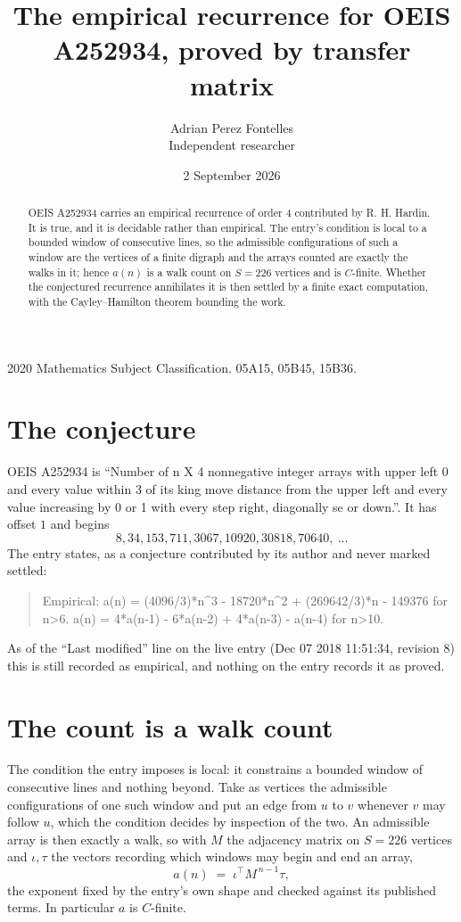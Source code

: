 \documentclass[11pt,a4paper]{article}
\title{The empirical recurrence for OEIS A252934, proved by transfer matrix}
\author{Adrian Perez Fontelles\\ \small Independent researcher}
\date{2 September 2026}
\theoremstyle{plain}
\theoremstyle{definition}
\begin{document}
\maketitle

\begin{abstract}
OEIS A252934 carries an empirical recurrence of order $4$ contributed by R. H. Hardin. It is
true, and it is decidable rather than empirical. The entry's condition is local to a bounded window of consecutive lines, so
the admissible configurations of such a window are the vertices of a finite digraph and the
arrays counted are exactly the walks in it; hence $a(n)$ is a walk count on $S=226$ vertices
and is $C$-finite. Whether the conjectured recurrence annihilates it is then settled by a
finite exact computation, with the Cayley--Hamilton theorem bounding the work.
\end{abstract}

\noindent\small 2020 Mathematics Subject Classification. 05A15, 05B45, 15B36.\normalsize

\section{The conjecture}

OEIS A252934 is ``Number of n X 4 nonnegative integer arrays with upper left 0 and every value within 3 of its king move distance from the upper left and every value increasing by 0 or 1 with every step right, diagonally se or down.''. It has offset $1$ and begins
\[
8, 34, 153, 711, 3067, 10920, 30818, 70640,\ \dots
\]
The entry states, as a conjecture contributed by its author and never marked settled:
\begin{quote}
Empirical: a(n) = (4096/3)*n\^{}3 - 18720*n\^{}2 + (269642/3)*n - 149376 for n>6. a(n) = 4*a(n-1) - 6*a(n-2) + 4*a(n-3) - a(n-4) for n>10.
\end{quote}
As of the ``Last modified'' line on the live entry (Dec 07 2018 11:51:34, revision 8) this is still
recorded as empirical, and nothing on the entry records it as proved.

\section{The count is a walk count}

The condition the entry imposes is local: it constrains a bounded window of consecutive lines and nothing beyond. Take as
vertices the admissible configurations of one such window and put an edge from $u$ to $v$
whenever $v$ may follow $u$, which the condition decides by inspection of the two. An
admissible array is then exactly a walk, so with $M$ the adjacency matrix on $S=226$ vertices
and $\iota,\tau$ the vectors recording which windows may begin and end an array,
\[
a(n)\;=\;\iota^{\!\top}M^{\,n-1}\tau ,
\]
the exponent fixed by the entry's own shape and checked against its published terms. In
particular $a$ is $C$-finite.
\end{document}
